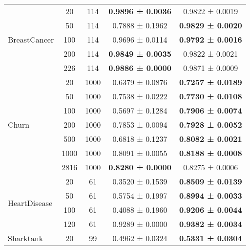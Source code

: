 \begin{table}[H]
{\begin{tabular}[H]{@{}lcccc@{}}
                              \midrule
\multirow{5}{*}{BreastCancer} & 20          & 114  & \textbf{0.9896 ± 0.0036} & 0.9822 ± 0.0019          \\
                              & 50          & 114  & 0.7888 ± 0.1962          & \textbf{0.9829 ± 0.0020} \\
                              & 100         & 114  & 0.9696 ± 0.0114          & \textbf{0.9792 ± 0.0016} \\
                              & 200         & 114  & \textbf{0.9849 ± 0.0035} & 0.9822 ± 0.0021          \\
                              & 226         & 114  & \textbf{0.9886 ± 0.0000} & 0.9871 ± 0.0009          \\
                              \midrule
\multirow{7}{*}{Churn}        & 20          & 1000 & 0.6379 ± 0.0876          & \textbf{0.7257 ± 0.0189} \\
                              & 50          & 1000 & 0.7538 ± 0.0222          & \textbf{0.7730 ± 0.0108} \\
                              & 100         & 1000 & 0.5697 ± 0.1284          & \textbf{0.7906 ± 0.0074} \\
                              & 200         & 1000 & 0.7853 ± 0.0094          & \textbf{0.7928 ± 0.0052} \\
                              & 500         & 1000 & 0.6818 ± 0.1237          & \textbf{0.8082 ± 0.0021} \\
                              & 1000        & 1000 & 0.8091 ± 0.0055          & \textbf{0.8188 ± 0.0008} \\
                              & 2816        & 1000 & \textbf{0.8280 ± 0.0000} & 0.8275 ± 0.0006          \\
                              \midrule
\multirow{4}{*}{HeartDisease} & 20          & 61   & 0.3520 ± 0.1539          & \textbf{0.8509 ± 0.0139} \\
                              & 50          & 61   & 0.5754 ± 0.1997          & \textbf{0.8994 ± 0.0033} \\
                              & 100         & 61   & 0.4088 ± 0.1960          & \textbf{0.9206 ± 0.0044} \\
                              & 120         & 61   & 0.9289 ± 0.0000          & \textbf{0.9382 ± 0.0034} \\
                              \midrule
\multirow{5}{*}{Sharktank}    & 20          & 99   & 0.4962 ± 0.0324          & \textbf{0.5331 ± 0.0304} \\

\end{tabular}}
\end{table}
